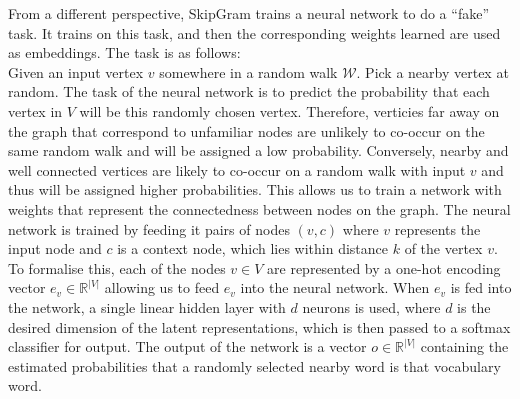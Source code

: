 \documentclass[a4paper]{article}
\begin{document}
From a different perspective, SkipGram trains a neural network to do
a ``fake'' task. It trains on this task, and then the corresponding weights
learned are used as embeddings. The task is as follows:\\
Given an input vertex $v$ somewhere in a random walk $\mathcal{W}$. Pick a
nearby vertex at random. The task of the neural network is to
predict the probability that each vertex in $V$ will be this randomly chosen
vertex. Therefore, verticies far away on the graph that correspond to unfamiliar
nodes are unlikely to co-occur on the same random walk and will be assigned a
low probability. Conversely, nearby and well connected vertices are likely to
co-occur on a random walk with input $v$ and thus will be assigned higher
probabilities. This allows us to train a network with weights that represent the
connectedness between nodes on the graph. The neural network is trained by
feeding it pairs of nodes $(v, c)$ where $v$ represents the input node and $c$
is a context node, which lies within distance $k$ of the vertex $v$.\\ 

To formalise this, each of the nodes $v \in V$ are represented by a one-hot
encoding vector $e_v \in \mathbb{R}^{|V|}$ allowing us to feed $e_v$ into the
neural network. When $e_v$ is fed into the network, a single linear hidden layer with
$d$ neurons is used, where $d$ is the desired dimension of the latent
representations, which is then passed to a softmax classifier for output. The
output of the network is a vector $o \in \mathbb{R}^{|V|}$ containing the estimated
probabilities that a randomly selected nearby word is that vocabulary word.
\end{document}
